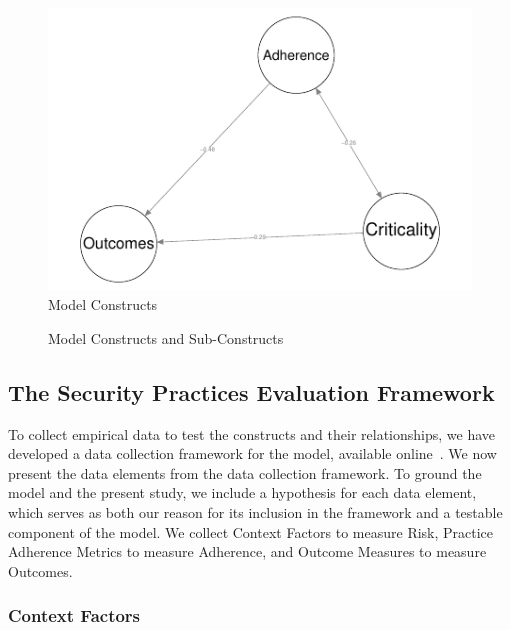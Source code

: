 \begin{figure}
		\includegraphics[width=\columnwidth]{modelzero}
	\caption{Model Constructs}
	\label{fig:model_constructs}
\end{figure}


\begin{figure}
	\caption{Model Constructs and Sub-Constructs}
	\label{fig:model_constructs_phases}
\end{figure}


\subsection{The Security Practices Evaluation Framework}

To collect empirical data to test the constructs and their relationships, we have developed a data collection framework for the model, available online~\cite{morrison2016spefsite}.   We now present the data elements from the data collection framework. To ground the model and the present study, we include a hypothesis for each data element, which serves as both our reason for its inclusion in the framework and a testable component of the model. We collect Context Factors to measure Risk, Practice Adherence Metrics to measure Adherence, and Outcome Measures to measure Outcomes.
\subsubsection{Context Factors}
\label{sec:model_cf}

